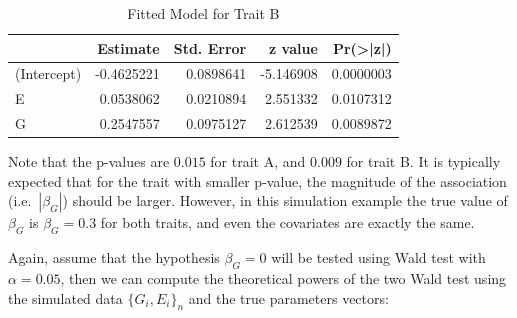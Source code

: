 \documentclass[
]{article}
\newenvironment{Shaded}{\begin{snugshade}}{\end{snugshade}}
\newcommand{\AttributeTok}[1]{\textcolor[rgb]{0.77,0.63,0.00}{#1}}
\newcommand{\DecValTok}[1]{\textcolor[rgb]{0.00,0.00,0.81}{#1}}
\newcommand{\DocumentationTok}[1]{\textcolor[rgb]{0.56,0.35,0.01}{\textbf{\textit{#1}}}}
\newcommand{\FunctionTok}[1]{\textcolor[rgb]{0.00,0.00,0.00}{#1}}
\newcommand{\NormalTok}[1]{#1}
\newcommand{\OtherTok}[1]{\textcolor[rgb]{0.56,0.35,0.01}{#1}}
\newcommand{\SpecialCharTok}[1]{\textcolor[rgb]{0.00,0.00,0.00}{#1}}
\newcommand{\StringTok}[1]{\textcolor[rgb]{0.31,0.60,0.02}{#1}}
\begin{document}
\begin{Shaded}
\end{Shaded}

\begin{table}[H]

\caption{\label{tab:unnamed-chunk-1}Fitted Model for Trait B}
\centering
\fontsize{10}{12}\selectfont
\begin{tabular}[t]{l|r|r|r|r}
\hline
  & Estimate & Std. Error & z value & Pr(>|z|)\\
\hline
(Intercept) & -0.4625221 & 0.0898641 & -5.146908 & 0.0000003\\
\hline
E & 0.0538062 & 0.0210894 & 2.551332 & 0.0107312\\
\hline
G & 0.2547557 & 0.0975127 & 2.612539 & 0.0089872\\
\hline
\end{tabular}
\end{table}

Note that the p-values are \(0.015\) for trait A, and \(0.009\) for
trait B. It is typically expected that for the trait with smaller
p-value, the magnitude of the association (i.e.~\(|\beta_G|\)) should be
larger. However, in this simulation example the true value of
\(\beta_G\) is \(\beta_G=0.3\) for both traits, and even the covariates
are exactly the same.

Again, assume that the hypothesis \(\beta_G = 0\) will be tested using
Wald test with \(\alpha=0.05\), then we can compute the theoretical
powers of the two Wald test using the simulated data \(\{G_i,E_i\}_n\)
and the true parameters vectors:
\end{document}
